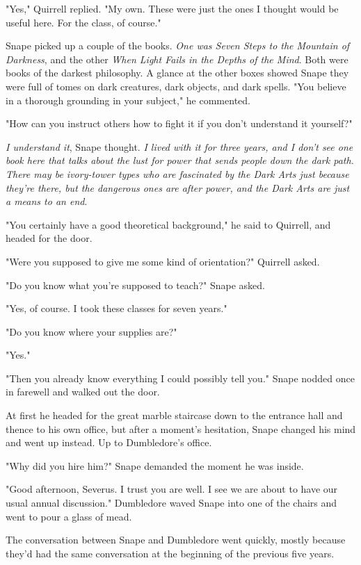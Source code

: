 \documentclass[a4paper,11pt]{article}
\begin{document}
"Yes," Quirrell replied. "My own. These were just the ones I thought would be useful here. For the class, of course."

Snape picked up a couple of the books. \emph{One was Seven Steps to the Mountain of Darkness}, and the other \emph{When Light Fails in the Depths of the Mind}. Both were books of the darkest philosophy. A glance at the other boxes showed Snape they were full of tomes on dark creatures, dark objects, and dark spells. "You believe in a thorough grounding in your subject," he commented.

"How can you instruct others how to fight it if you don't understand it yourself?"

\emph{I understand it}, Snape thought. \emph{I lived with it for three years, and I don't see one book here that talks about the lust for power that sends people down the dark path. There may be ivory-tower types who are fascinated by the Dark Arts just because they're there, but the dangerous ones are after power, and the Dark Arts are just a means to an end}.

"You certainly have a good theoretical background," he said to Quirrell, and headed for the door.

"Were you supposed to give me some kind of orientation?" Quirrell asked.

"Do you know what you're supposed to teach?" Snape asked.

"Yes, of course. I took these classes for seven years."

"Do you know where your supplies are?"

"Yes."

"Then you already know everything I could possibly tell you." Snape nodded once in farewell and walked out the door.

At first he headed for the great marble staircase down to the entrance hall and thence to his own office, but after a moment's hesitation, Snape changed his mind and went up instead. Up to Dumbledore's office.

"Why did you hire him?" Snape demanded the moment he was inside.

"Good afternoon, Severus. I trust you are well. I see we are about to have our usual annual discussion." Dumbledore waved Snape into one of the chairs and went to pour a glass of mead.

The conversation between Snape and Dumbledore went quickly, mostly because they'd had the same conversation at the beginning of the previous five years.
\end{document}

